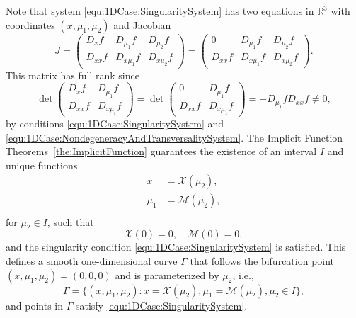 \documentclass[12pt]{article}
\begin{document}
Note that system \eqref{equ:1DCase:SingularitySystem} has two equations in $\mathbb{R}^{3}$ with coordinates $(x,\mu_{1}, \mu_{2})$ and Jacobian
\begin{equation*}
    J = \begin{pmatrix}
         D_{x}f & D_{\mu_{1}}f & D_{\mu_{2}}f \\
         D_{xx}f & D_{x\mu_{1}}f & D_{x\mu_{2}}f
        \end{pmatrix} =
        \begin{pmatrix}
         0 & D_{\mu_{1}}f & D_{\mu_{2}}f \\
         D_{xx}f & D_{x\mu_{1}}f & D_{x\mu_{2}}f
        \end{pmatrix}.
\end{equation*}
This matrix has full rank since
\begin{equation*}
    \det \begin{pmatrix}
         D_{x}f & D_{\mu_{1}}f\\
         D_{xx}f & D_{x\mu_{i}}f
    \end{pmatrix} = 
    \det \begin{pmatrix}
         0 & D_{\mu_{1}}f\\
         D_{xx}f & D_{x\mu_{1}}f
    \end{pmatrix} = -D_{\mu_{1}}fD_{xx}f\neq 0,
\end{equation*}
by conditions \eqref{equ:1DCase:SingularitySystem} and \eqref{equ:1DCase:NondegeneracyAndTransversalitySystem}. The Implicit Function Theorems~\ref{the:ImplicitFunction} guarantees the existence of an interval $I$ and unique functions
\begin{equation}
    \begin{aligned}
    x &= \mathcal{X}(\mu_{2}), \\
    \mu_{1} &= \mathcal{M}(\mu_{2}), \\
    \end{aligned}
    \label{equ:1DCase:XandMfunctions}
\end{equation}
for $\mu_{2}\in I$, such that
\begin{equation*}
    \mathcal{X}(0)=0,\quad \mathcal{M}(0)=0,
\end{equation*}
and the singularity condition \eqref{equ:1DCase:SingularitySystem} is satisfied. This defines a smooth one-dimensional curve $\Gamma$ that follows the bifurcation point $(x,\mu_{1},\mu_{2})=(0,0,0)$ and is parameterized by $\mu_{2}$, i.e.,
\begin{equation}
    \Gamma = \{ (x,\mu_{1},\mu_{2}) \colon 
    x = \mathcal{X}(\mu_{2}), \mu_{1} = \mathcal{M}(\mu_{2}), \mu_{2}\in I \},
\end{equation}
and points in $\Gamma$ satisfy \eqref{equ:1DCase:SingularitySystem}.
\end{document}
